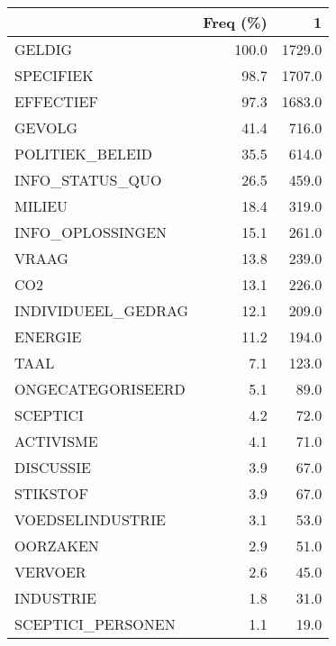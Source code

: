 \begin{tabular}{lrr}
\toprule
{} &  Freq (\%) &       1 \\
\midrule
GELDIG             &     100.0 &  1729.0 \\
SPECIFIEK          &      98.7 &  1707.0 \\
EFFECTIEF          &      97.3 &  1683.0 \\
GEVOLG             &      41.4 &   716.0 \\
POLITIEK\_BELEID    &      35.5 &   614.0 \\
INFO\_STATUS\_QUO    &      26.5 &   459.0 \\
MILIEU             &      18.4 &   319.0 \\
INFO\_OPLOSSINGEN   &      15.1 &   261.0 \\
VRAAG              &      13.8 &   239.0 \\
CO2                &      13.1 &   226.0 \\
INDIVIDUEEL\_GEDRAG &      12.1 &   209.0 \\
ENERGIE            &      11.2 &   194.0 \\
TAAL               &       7.1 &   123.0 \\
ONGECATEGORISEERD  &       5.1 &    89.0 \\
SCEPTICI           &       4.2 &    72.0 \\
ACTIVISME          &       4.1 &    71.0 \\
DISCUSSIE          &       3.9 &    67.0 \\
STIKSTOF           &       3.9 &    67.0 \\
VOEDSELINDUSTRIE   &       3.1 &    53.0 \\
OORZAKEN           &       2.9 &    51.0 \\
VERVOER            &       2.6 &    45.0 \\
INDUSTRIE          &       1.8 &    31.0 \\
SCEPTICI\_PERSONEN  &       1.1 &    19.0 \\
\bottomrule
\end{tabular}
